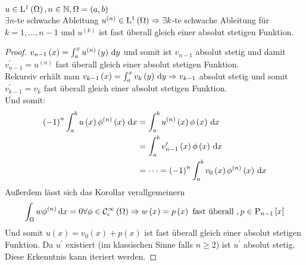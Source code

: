 \begin{lemma}[Satz]
	$u\in\mathrm{L}^{1}\left(\Omega\right), n\in\mathbb{N},\Omega=\left(a,b\right)$\\
	$\exists n$-te schwache Ableitung $u^{\left(n\right)}\in\mathrm{L}^{1}\left(\Omega\right) \Rightarrow \exists k$-te schwache Ableitung für $k=1,\dots,n-1$ und $u^{\left(k\right)}$ ist fast überall gleich einer absolut stetigen Funktion.
\end{lemma}
\begin{proof}
	$v_{n-1}\left(x\right) = \int_{a}^{x}u^{\left(n\right)}\left(y\right)\,\mathrm{d} y$ und somit ist $v_{n-1}$ absolut stetig und damit $v_{n-1}^{\prime} = u^{\left(n\right)}$ fast überall gleich einer absolut stetigen Funktion.\\
	Rekursiv erhält man $v_{k-1}\left(x\right) = \int_{a}^{x}v_{k}\left(y\right)\,\mathrm{d} y \Rightarrow v_{k-1}$ absolut stetig und somit $v_{k-1}^{\prime} = v_{k}$ fast überall gleich einer absolut stetigen Funktion.\\
	Und somit:
	\begin{align*}
		\left(-1\right)^{n}\int_{a}^{b}u\left(x\right)\phi^{\left(n\right)}\left(x\right)\,\mathrm{d} x &= \int_{a}^{b}u^{\left(n\right)}\left(x\right)\phi\left(x\right)\,\mathrm{d} x\\
			&= \int_{a}^{b} v_{n-1}^{\prime}\left(x\right)\phi\left(x\right)\,\mathrm{d} x\\
			&= \dots = \left(-1\right)^{n}\int_{a}^{b}v_{0}\left(x\right)\phi^{\left(n\right)}\left(x\right)\,\mathrm{d} x
	\end{align*}
	Außerdem lässt sich das Korollar verallgemeinern
	\begin{equation*}
		\int_{\Omega}w\phi^{\left(n\right)}\,\mathrm{d} x = 0 \forall \phi\in\mathcal{C}_{\text{c}}^{\infty}\left(\Omega\right) \Rightarrow w\left(x\right) = p\left(x\right) \text{ fast überall }, p\in\mathrm{P}_{n-1}\left[x\right]
	\end{equation*}
	Und somit $u\left(x\right) = v_{0}\left(x\right) + p\left(x\right)$ ist fast überall gleich einer absolut stetigen Funktion. Da $u^{\prime}$ existiert (im klassischen Sinne falls $n\geq 2$) ist $u^{\prime}$ absolut stetig. Diese Erkenntnis kann iteriert werden.
\end{proof}

